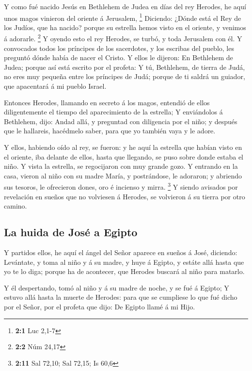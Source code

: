  Y como fué nacido Jesús en Bethlehem de Judea en días del
rey Herodes, he aquí unos magos vinieron del oriente á Jerusalem,
\footnote{\textbf{2:1} Luc 2,1-7}  Diciendo: ¿Dónde está
el Rey de los Judíos, que ha nacido? porque su estrella hemos visto en
el oriente, y venimos á adorarle. \footnote{\textbf{2:2} Núm 24,17}
 Y oyendo esto el rey Herodes, se turbó, y toda Jerusalem
con él.  Y convocados todos los príncipes de los
sacerdotes, y los escribas del pueblo, les preguntó dónde había de nacer
el Cristo.  Y ellos le dijeron: En Bethlehem de Judea;
porque así está escrito por el profeta:  Y tú, Bethlehem,
de tierra de Judá, no eres muy pequeña entre los príncipes de Judá;
porque de ti saldrá un guiador, que apacentará á mi pueblo Israel.

 Entonces Herodes, llamando en secreto á los magos,
entendió de ellos diligentemente el tiempo del aparecimiento de la
estrella;  Y enviándolos á Bethlehem, dijo: Andad allá, y
preguntad con diligencia por el niño; y después que le hallareis,
hacédmelo saber, para que yo también vaya y le adore.

 Y ellos, habiendo oído al rey, se fueron: y he aquí la
estrella que habían visto en el oriente, iba delante de ellos, hasta que
llegando, se puso sobre donde estaba el niño.  Y vista la
estrella, se regocijaron con muy grande gozo.  Y entrando
en la casa, vieron al niño con su madre María, y postrándose, le
adoraron; y abriendo sus tesoros, le ofrecieron dones, oro é incienso y
mirra. \footnote{\textbf{2:11} Sal 72,10; Sal 72,15; Is 60,6}
 Y siendo avisados por revelación en sueños que no
volviesen á Herodes, se volvieron á su tierra por otro camino.

\hypertarget{la-huida-de-josuxe9-a-egipto}{%
\subsection{La huida de José a
Egipto}\label{la-huida-de-josuxe9-a-egipto}}

 Y partidos ellos, he aquí el ángel del Señor aparece en
sueños á José, diciendo: Levántate, y toma al niño y á su madre, y huye
á Egipto, y estáte allá hasta que yo te lo diga; porque ha de acontecer,
que Herodes buscará al niño para matarlo.

 Y él despertando, tomó al niño y á su madre de noche, y
se fué á Egipto;  Y estuvo allá hasta la muerte de
Herodes: para que se cumpliese lo que fué dicho por el Señor, por el
profeta que dijo: De Egipto llamé á mi Hijo.

